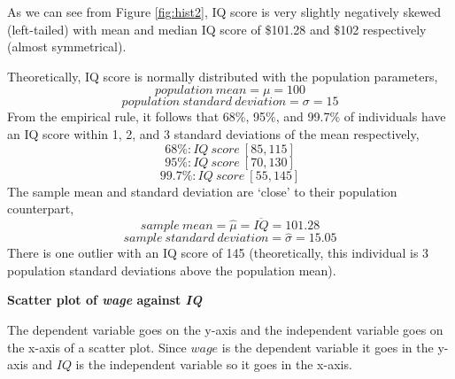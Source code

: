 \documentclass[12pt]{report}
\begin{document}
\vspace{-\baselineskip}
\noindent As we can see from Figure \ref{fig:hist2}, IQ score is very slightly negatively skewed (left-tailed) with mean and median IQ score of \$101.28 and \$102 respectively (almost symmetrical). \par
\noindent Theoretically, IQ score is normally distributed with the population parameters,
$$population\ mean = \mu = 100$$
$$population\ standard\ deviation = \sigma = 15$$
\noindent From the empirical rule, it follows that 68\%, 95\%, and 99.7\% of individuals have an IQ score within 1, 2, and 3 standard deviations of the mean respectively,
$$68\%: IQ\ score\ [85,115]$$
$$95\%: IQ\ score\ [70,130]$$
$$99.7\%: IQ\ score\ [55,145]$$
\noindent The sample mean and standard deviation are ‘close’ to their population counterpart,
$$sample\ mean = \hat{\mu} = \overline{IQ} = 101.28$$
$$sample\ standard\ deviation = \hat{\sigma} = 15.05$$
\noindent There is one outlier with an IQ score of 145 (theoretically, this individual is 3 population standard deviations above the population mean).
\begin{center}
	\noindent \textbf{Scatter plot of \textit{wage} against \textit{IQ}}
\end{center}
\noindent The dependent variable goes on the y-axis and the independent variable goes on the x-axis of a scatter plot. Since $wage$ is the dependent variable it goes in the y-axis and $IQ$ is the independent variable so it goes in the x-axis.
\end{document}
